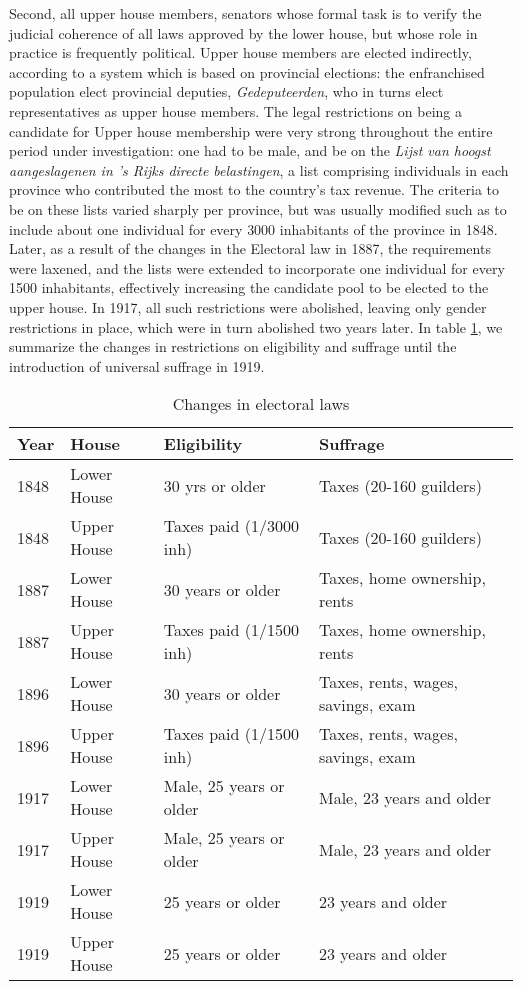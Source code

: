 Second, all upper house members, senators whose formal task is to verify the judicial coherence of all laws approved by the lower house, but whose role in practice is frequently political.\autocite{van1999eerste} Upper house members are elected indirectly, according to a system which is based on provincial elections: the enfranchised population elect provincial deputies, \textit{Gedeputeerden}, who in turns elect representatives as upper house members. The legal restrictions on being a candidate for Upper house membership were very strong throughout the entire period under investigation: one had to be male, and be on the \textit{Lijst van hoogst aangeslagenen in 's Rijks directe belastingen}, a list comprising individuals in each province who contributed the most to the country's tax revenue. \autocite{moes1994lijsten} The criteria to be on these lists varied sharply per province, but was usually modified such as to include about one individual for every 3000 inhabitants of the province in 1848. \autocite{moes2012onder} Later, as a result of the changes in the Electoral law in 1887, the requirements were laxened, and the lists were extended to incorporate one individual for every 1500 inhabitants, effectively increasing the candidate pool to be elected to the upper house. In 1917, all such restrictions were abolished, leaving only gender restrictions in place, which were in turn abolished two years later. In table \ref{tab:upperhouselowerhouse}, we summarize the changes in restrictions on eligibility and suffrage until the introduction of universal suffrage in 1919. 

\begin{table}[!ht]
    \footnotesize
    \centering
    \begin{tabular}{llll}
        Year & House & Eligibility & Suffrage  \\ \hline
        1848 & Lower House & 30 yrs or older & Taxes (20-160 guilders) \\
        1848 & Upper House & Taxes paid (1/3000 inh) & Taxes (20-160 guilders) \\
        1887 & Lower House & 30 years or older & Taxes, home ownership, rents \\
        1887 & Upper House & Taxes paid (1/1500 inh) & Taxes, home ownership, rents \\
        1896 & Lower House & 30 years or older & Taxes, rents, wages, savings, exam \\
        1896 & Upper House & Taxes paid (1/1500 inh) & Taxes, rents, wages, savings, exam \\
        1917 & Lower House & Male, 25 years or older & Male, 23 years and older \\
        1917 & Upper House & Male, 25 years or older  & Male, 23 years and older \\
        1919 & Lower House & 25 years or older & 23 years and older \\
        1919 & Upper House & 25 years or older & 23 years and older \\ \hline
    \end{tabular}
    \caption{Changes in electoral laws}
    \label{tab:upperhouselowerhouse}
\end{table}

